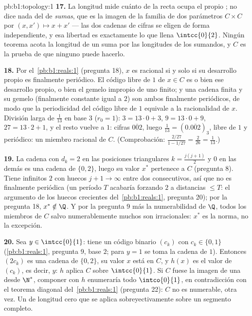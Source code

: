 \begin{solution}{pb:b1:topology:1}
\textbf{17.} La longitud mide cuánto de la recta ocupa el propio
; no dice nada del  de \emph{sumas}, que es la
imagen de la familia de dos parámetros $C \times C$ por
$(x, x') \mapsto x + x'$ --- las dos cadenas de cifras se eligen de
forma independiente, y esa libertad es exactamente lo que llena
$\intcc{0}{2}$. Ningún teorema acota la longitud de un  suma
por las longitudes de los sumandos, y $C$ es la prueba de que ninguno
puede hacerlo.

\textbf{18.} Por el~\cref{pb:b1:reals:1} (pregunta 18), $x$ es
racional si y solo si su desarrollo propio es finalmente periódico.
El código libre de $1$ de $x \in C$ es o bien ese desarrollo propio,
o bien el gemelo impropio de uno finito; y una cadena finita y su
gemelo (finalmente constante igual a $2$) son ambos finalmente
periódicos, de modo que la periodicidad del código libre de $1$
equivale a la racionalidad de $x$. División larga de $\frac1{13}$ en
base $3$ ($r_0 = 1$): $3 = 13\cdot0 + 3$, $9 = 13\cdot0 + 9$,
$27 = 13\cdot2 + 1$, y el resto vuelve a $1$: cifras
$\overline{002}$, luego $\frac1{13} = (0.\overline{002})_3$, libre de
$1$ y periódico: un miembro racional de $C$. (Comprobación:
$\frac{2/27}{1 - 1/27} = \frac{2}{26} = \frac1{13}$.)

\textbf{19.} La cadena con $d_k = 2$ en las posiciones triangulares
$k = \frac{j(j+1)}{2}$ y $0$ en las demás es una cadena de
$\{0,2\}$, luego su valor $x^*$ pertenece a $C$ (pregunta 8). Tiene
infinitos $2$ con huecos $j + 1 \to \infty$ entre dos consecutivos,
así que no es finalmente periódica (un período $T$ acabaría
forzando $2$ a distancias $\leq T$: el argumento de los huecos
crecientes del~\cref{pb:b1:reals:1}, pregunta 20); por la
pregunta 18, $x^* \notin \Q$. Y por la pregunta 9 más la
numerabilidad de $\Q$, todos los miembros de $C$ salvo
numerablemente muchos son irracionales: $x^*$ es la norma, no la
excepción.

\textbf{20.} Sea $y \in \intcc{0}{1}$: tiene un código binario
$(c_k)$ con $c_k \in \{0, 1\}$ (\cref{pb:b1:reals:1}, pregunta 9,
base $2$; para $y = 1$ se toma la cadena de $1$). Entonces $(2c_k)$
es una cadena de $\{0,2\}$, su valor $x$ está en $C$, y $h(x)$ es el
valor de $(c_k)$, es decir, $y$: $h$ aplica $C$ sobre
$\intcc{0}{1}$. Si $C$ fuese la imagen de una  desde
$\N^*$, componer con $h$ enumeraría todo $\intco{0}{1}$, en
contradicción con el teorema diagonal del~\cref{pb:b1:reals:1}
(pregunta 22): $C$ no es numerable, otra vez. Un  de
longitud cero que se aplica sobreyectivamente sobre un segmento
completo.


\end{solution}
